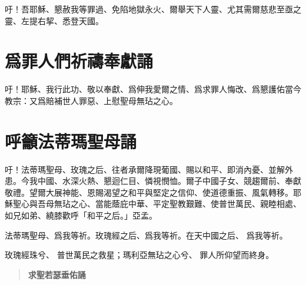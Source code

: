 吁！吾耶穌、懇赦我等罪過、免陷地獄永火、爾舉天下人靈、尤其需爾慈悲至亟之靈、左提右挈、悉登天國。

\section*{爲罪人們祈禱奉獻誦}
吁！耶穌、我行此功、敬以奉獻、爲伸我愛爾之情、爲求罪人悔改、爲懇護佑當今教宗：又爲賠補世人罪惡、上慰聖母無玷之心。

\section*{呼籲法蒂瑪聖母誦}
吁！法蒂瑪聖母、玫瑰之后、往者承爾降現葡國、賜以和平、即消內憂、並解外患。今我中國、水深火熱、懇迴仁目、憐視憫恤。爾子中國子女、競趨爾前、奉獻敬禮。望爾大展神能、恩賜渴望之和平與堅定之信仰、使道德重振、風氣轉移。耶穌聖心與吾母無玷之心、當能蔭庇中華、平定聖教艱難、使普世萬民、親睦相處、如兄如弟、繞膝歡呼「和平之后。」{\cspace}亞孟。

法蒂瑪聖母、爲我等祈。玫瑰經之后、爲我等祈。在天中國之后、 爲我等祈。 

玫瑰經珠兮、 普世萬民之救星；瑪利亞無玷之心兮、 罪人所仰望而終身。

\begin{quote}\bfseries 求聖若瑟垂佑誦\end{quote}
